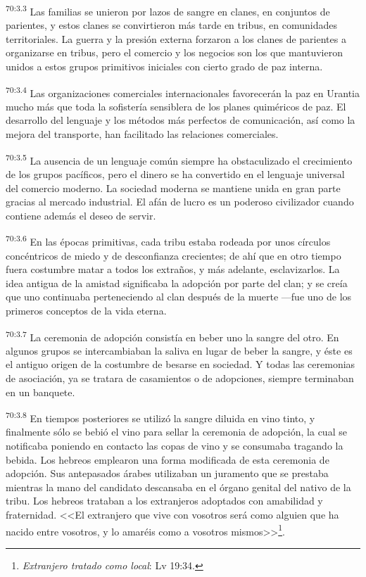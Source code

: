 \par
\textsuperscript{70:3.3} Las familias se unieron por lazos de sangre en clanes, en conjuntos de parientes, y estos clanes se convirtieron más tarde en tribus, en comunidades territoriales. La guerra y la presión externa forzaron a los clanes de parientes a organizarse en tribus, pero el comercio y los negocios son los que mantuvieron unidos a estos grupos primitivos iniciales con cierto grado de paz interna.

\par
\textsuperscript{70:3.4} Las organizaciones comerciales internacionales favorecerán la paz en Urantia mucho más que toda la sofistería sensiblera de los planes quiméricos de paz. El desarrollo del lenguaje y los métodos más perfectos de comunicación, así como la mejora del transporte, han facilitado las relaciones comerciales.

\par
\textsuperscript{70:3.5} La ausencia de un lenguaje común siempre ha obstaculizado el crecimiento de los grupos pacíficos, pero el dinero se ha convertido en el lenguaje universal del comercio moderno. La sociedad moderna se mantiene unida en gran parte gracias al mercado industrial. El afán de lucro es un poderoso civilizador cuando contiene además el deseo de servir.

\par
\textsuperscript{70:3.6} En las épocas primitivas, cada tribu estaba rodeada por unos círculos concéntricos de miedo y de desconfianza crecientes; de ahí que en otro tiempo fuera costumbre matar a todos los extraños, y más adelante, esclavizarlos. La idea antigua de la amistad significaba la adopción por parte del clan; y se creía que uno continuaba perteneciendo al clan después de la muerte ---fue uno de los primeros conceptos de la vida eterna.

\par
\textsuperscript{70:3.7} La ceremonia de adopción consistía en beber uno la sangre del otro. En algunos grupos se intercambiaban la saliva en lugar de beber la sangre, y éste es el antiguo origen de la costumbre de besarse en sociedad. Y todas las ceremonias de asociación, ya se tratara de casamientos o de adopciones, siempre terminaban en un banquete.

\par
\textsuperscript{70:3.8} En tiempos posteriores se utilizó la sangre diluida en vino tinto, y finalmente sólo se bebió el vino para sellar la ceremonia de adopción, la cual se notificaba poniendo en contacto las copas de vino y se consumaba tragando la bebida. Los hebreos emplearon una forma modificada de esta ceremonia de adopción. Sus antepasados árabes utilizaban un juramento que se prestaba mientras la mano del candidato descansaba en el órgano genital del nativo de la tribu. Los hebreos trataban a los extranjeros adoptados con amabilidad y fraternidad. <<El extranjero que vive con vosotros será como alguien que ha nacido entre vosotros, y lo amaréis como a vosotros mismos>>\footnote{\textit{Extranjero tratado como local}: Lv 19:34.}.

